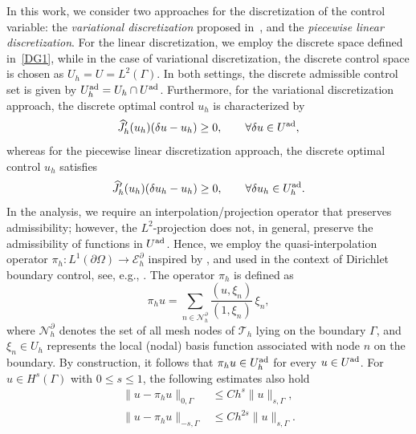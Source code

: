 \documentclass[a4paper,10pt]{article}
\newcommand{\Uad}{{U^{\textup{ad}}}}
\newcommand{\Uadh}{{U^{\textup{ad}}_h}}
\numberwithin{theorem}{section}
\begin{document}
In this work, we consider two approaches for the discretization of the control variable: 
the \emph{variational discretization} proposed in~\cite{MHinze_2005a}, 
and the \emph{piecewise linear discretization}. 
For the linear discretization, we employ the discrete space defined in~\eqref{DG1}, 
while in the case of variational discretization, the discrete control space is chosen as 
$U_h = U = L^2(\Gamma)$. 
In both settings, the discrete admissible control set is given by 
$\Uadh = U_h \cap \Uad$. 
Furthermore, for the variational discretization approach, the discrete optimal control $u_h$ is characterized by
\begin{equation}\label{reduced_disc_var_variational}
    \widehat{J}_h'(u_h)(\delta u - u_h) \ge 0,
    \qquad \forall \delta u \in \Uad,
\end{equation}
whereas for the piecewise linear discretization approach, the discrete optimal control $u_h$ satisfies
\begin{equation}\label{reduced_disc_variational}
    \widehat{J}_h'(u_h)(\delta u_h - u_h) \ge 0,
    \qquad \forall \delta u_h \in \Uadh.
\end{equation}
In the analysis, we require an interpolation/projection operator that preserves admissibility; however, the $L^2$-projection does not, in general, preserve the admissibility of functions in $\Uad$. Hence, we employ the quasi-interpolation operator $\pi_h : L^1(\partial \Omega) \to \mathcal{E}_h^\partial$ inspired by \cite{CCarstensen_1999}, and used in the context of Dirichlet boundary control, see, e.g.,  \cite{JPfefferer_BVexler_2025}. The operator $\pi_h$ is defined as
\begin{equation}\label{def:quasi_interpolation}
    \pi_h u = \sum_{n \in \mathcal{N}_h^\partial} \frac{(u, \xi_n)}{(1, \xi_n)} \, \xi_n,
\end{equation}
where $\mathcal{N}_h^\partial$ denotes the set of all mesh nodes of $\mathcal{T}_h$ lying on the boundary $\Gamma$, and $\xi_n \in U_h$ represents the local (nodal) basis function associated with node $n$ on the boundary. By construction, it follows that $\pi_h u \in \Uadh$ for every $u \in \Uad$. For $u \in H^{s}(\Gamma)$  with $0 \leq s \leq 1$, the following estimates  also hold \cite[Lemma~5.5]{JPfefferer_BVexler_2025}
\begin{subequations} \label{ineq:quasi_interpolation}
\begin{align}
  \| u - \pi_h u \|_{0,\Gamma} &\leq C h^{s} \| u \|_{s,\Gamma}, \label{ineq:quasi_interpolationa} \\[4pt]
  \| u - \pi_h u \|_{-s,\Gamma} &\leq C h^{2s} \| u \|_{s,\Gamma}. \label{ineq:quasi_interpolationb}
\end{align}
\end{subequations}
\end{document}

